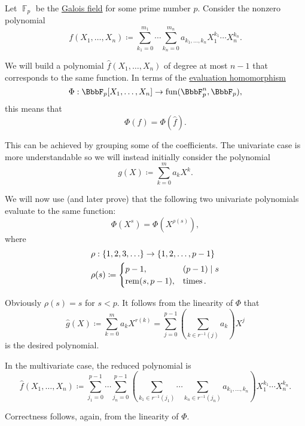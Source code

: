 \begin{algorithm}\label{alg:finite_field_polynomial_reduction}
  Let \( \BbbF_p \) be the \hyperref[thm:galois_field_existence]{Galois field} for some prime number \( p \). Consider the nonzero polynomial
  \begin{equation*}
    f(X_1, \ldots, X_n) \coloneqq \sum_{k_1=0}^{m_1} \cdots \sum_{k_n=0}^{m_n} a_{k_1,\ldots,k_n} X_1^{k_1} \cdots X_n^{k_n}.
  \end{equation*}

  We will build a polynomial \( \hat f(X_1, \ldots, X_n) \) of degree at most \( n - 1 \) that corresponds to the same function. In terms of the \hyperref[thm:polynomial_ring_universal_property]{evaluation homomorphism}
  \begin{equation*}
    \Phi: \BbbF_p[X_1, \ldots, X_n] \to \fun(\BbbF_p^n, \BbbF_p),
  \end{equation*}
  this means that
  \begin{equation*}
    \Phi(f) = \Phi(\hat f).
  \end{equation*}

  This can be achieved by grouping some of the coefficients. The univariate case is more understandable so we will instead initially consider the polynomial
  \begin{equation*}
    g(X) \coloneqq \sum_{k=0}^m a_k X^k.
  \end{equation*}

  We will now use (and later prove) that the following two univariate polynomials evaluate to the same function:
  \begin{equation}\label{eq:alg:finite_field_polynomial_reduction/reduction}
    \Phi(X^s) = \Phi(X^{\rho(s)}),
  \end{equation}
  where
  \begin{align*}
    &\rho: \{ 1, 2, 3, \ldots \} \to \{ 1, 2, \ldots, p - 1 \} \\
    &\rho(s) \coloneqq \begin{cases}
      p - 1,          &(p - 1) \mid s \\
      \operatorname{rem}(s, p - 1), &\mathop{\text{times}}.
    \end{cases}
  \end{align*}

  Obviously \( \rho(s) = s \) for \( s < p \). It follows from the linearity of \( \Phi \) that
  \begin{equation*}
    \hat g(X)
    \coloneqq
    \sum_{k=0}^m a_k X^{r(k)}
    =
    \sum_{j=0}^{p-1} \left( \sum_{k \in r^{-1}(j)} a_k \right) X^j
  \end{equation*}
  is the desired polynomial.

  In the multivariate case, the reduced polynomial is
  \begin{equation*}
    \hat f(X_1, \ldots, X_n) \coloneqq \sum_{j_1=0}^{p-1} \cdots \sum_{j_n=0}^{p-1} \left( \sum_{k_1 \in r^{-1}(j_1)} \cdots \sum_{k_n \in r^{-1}(j_n)} a_{k_1,\ldots,k_n} \right) X_1^{k_1} \cdots X_n^{k_n}.
  \end{equation*}

  Correctness follows, again, from the linearity of \( \Phi \).
\end{algorithm}

